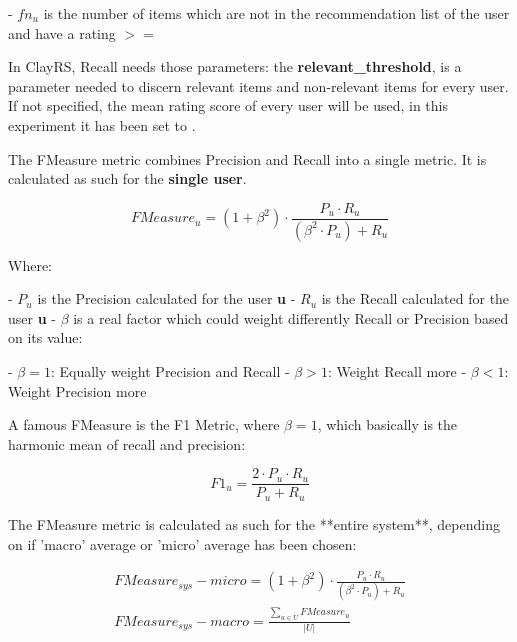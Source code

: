     - $fn_u$ is the number of items which are not in the recommendation list of the user and have a
      rating $>=$ 
        \textbf{}
        \textbf{}

\hfill\break

In ClayRS, Recall needs those parameters:
\hfill\break
the \textbf{relevant\_threshold}, is a parameter needed to discern relevant items and non-relevant items for every user.
If not specified, the mean rating score of every user will be used, in this experiment it has been set to
\textbf{}.
\hfill\break



The FMeasure metric combines Precision and Recall into a single metric.
It is calculated as such for the \textbf{single user}.

    \[
    FMeasure_u = (1 + \beta^2) \cdot \frac{P_u \cdot R_u}{(\beta^2 \cdot P_u) + R_u}
    \]

    Where:

    - $P_u$ is the Precision calculated for the user \textbf{u}
    - $R_u$ is the Recall calculated for the user \textbf{u}
    - $\beta$ is a real factor which could weight differently Recall or Precision based on its value:

        - $\beta = 1$: Equally weight Precision and Recall
        - $\beta > 1$: Weight Recall more
        - $\beta < 1$: Weight Precision more

\hfill\break

A famous FMeasure is the F1 Metric, where $\beta = 1$, which basically is the harmonic mean of recall and
precision:

    \[
    F1_u = \frac{2 \cdot P_u \cdot R_u}{P_u + R_u}
    \]

\hfill\break

The FMeasure metric is calculated as such for the **entire system**, depending on if 'macro' average or 'micro'
average has been chosen:

    \begin{gather*}
        FMeasure_{sys} - micro = (1 + \beta^2) \cdot \frac{P_u \cdot R_u}{(\beta^2 \cdot P_u) + R_u}\\
        FMeasure_{sys} - macro = \frac{\sum_{u \in U} FMeasure_u}{|U|}\\
    \end{gather*}

